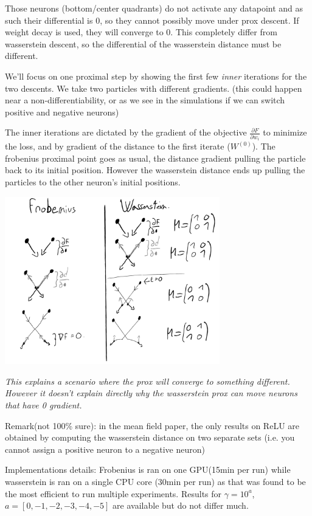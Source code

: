 Those neurons (bottom/center quadrants) do not activate any datapoint and as such their differential is 0, so they cannot possibly move under prox descent. If weight decay is used, they will converge to 0. This completely differ from wasserstein descent, so the differential of the wasserstein distance must be different.

We'll focus on one proximal step by showing the first few \emph{inner} iterations for the two descents. We take two particles with different gradients. (this could happen near a non-differentiability, or as we see in the simulations if we can switch positive and negative neurons)

The inner iterations are dictated by the gradient of the objective $\frac{\partial F}{\partial w_i}$ to minimize the loss, and by gradient of the distance to the first iterate ($W^{(0)}$). The frobenius proximal point goes as usual, the distance gradient pulling the particle back to its initial position. However the wasserstein distance ends up pulling the particles to the other neuron's initial positions.

\includegraphics[width=0.7\textwidth]{imgs/schema_one_prox_step.png}

\emph{This explains a scenario where the prox will converge to something different. However it doesn't explain directly why the wasserstein prox can move neurons that have 0 gradient.}

Remark(not 100\% sure): in the mean field paper, the only results on ReLU are obtained by computing the wasserstein distance on two separate sets (i.e. you cannot assign a positive neuron to a negative neuron)


Implementations details: Frobenius is ran on one GPU(15min per run) while wasserstein is ran on a single CPU core (30min per run) as that was found to be the most efficient to run multiple experiments. Results for $\gamma=10^{a}$, $a=[0, -1, -2, -3, -4, -5]$ are available but do not differ much.

